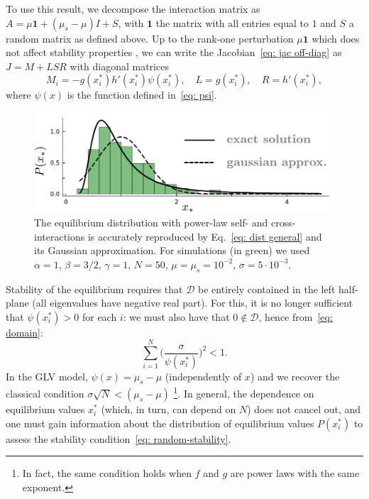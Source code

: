 To use this result, we decompose the interaction matrix as $A = \mu\mathbf{1} + (\mu_s-\mu)I + S$,
with $\mathbf{1}$ the matrix with all entries equal to $1$ and $S$ a random matrix as defined above.
Up to the rank-one perturbation $\mu\mathbf{1}$ which does not affect stability properties \cite{Stone2018}, we can write the Jacobian~\eqref{eq: jac off-diag} as $J = M + LSR$ with diagonal matrices
\begin{equation}
    M_i = - g(x_i^*)h'(x_i^*)\psi(x_i^*),\quad L = g(x_i^*), \quad R = h'(x_i^*),
\end{equation}
where $\psi(x)$ is the function defined in~\eqref{eq: psi}. 
\begin{figure}[t!]
    \includegraphics[width=.45\textwidth]{figs/cavity.pdf}
    \caption{The equilibrium distribution with power-law self- and cross-interactions is accurately reproduced by 
    Eq.~\eqref{eq: dist general} and its Gaussian approximation.
    For simulations (in green) we used $\alpha=1$, $\beta=3/2$,
    $\gamma=1$, $N=50$, $\mu=\mu_s=10^{-2}$, $\sigma=5\cdot 10^{-3}$.}
    \label{fig: cavity sol.}
\end{figure}
Stability of the equilibrium requires that $\mathcal{D}$ be entirely contained in the left half-plane (all eigenvalues have negative real part). For this, it is no longer sufficient that $\psi(x_i^*) > 0$ for each $i$: we must also have that $0\notin \mathcal{D}$, hence from~\eqref{eq: domain}:
\begin{equation}
    \sum_{i=1}^N \Big(\frac{\sigma}{\psi(x_i^*)}\Big)^{2}
    < 1.
    \label{eq: random-stability}
\end{equation}
In the GLV model, $\psi(x) = \mu_s - \mu$ (independently of $x$) and we recover the classical condition $\sigma\sqrt{N} < (\mu_s-\mu)$ \footnote{In fact, the same condition holds when $f$ and $g$ are power laws with the same exponent.}. In general, the dependence on equilibrium values $x_i^*$ (which, in turn, can depend on $N$) does not cancel out, and one must gain information about the distribution of equilibrium values $P(x_i^*)$ to assess the stability condition~\eqref{eq: random-stability}.